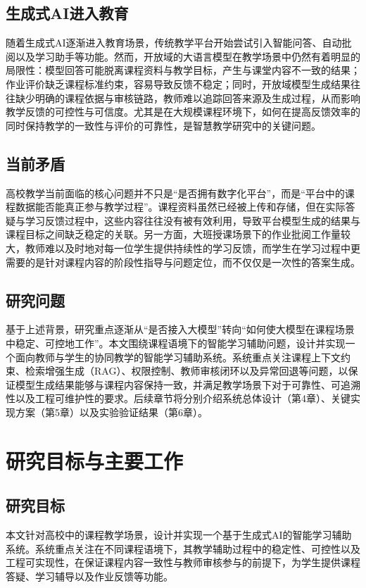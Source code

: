\documentclass[12pt,a4paper,oneside]{ctexbook}
\numberwithin{equation}{chapter}
\begin{document}
\subsection{生成式AI进入教育}
随着生成式AI逐渐进入教育场景，传统教学平台开始尝试引入智能问答、自动批阅以及学习助手等功能\cite{ref1,ref5}。然而，开放域的大语言模型在教学场景中仍然有着明显的局限性：模型回答可能脱离课程资料与教学目标，产生与课堂内容不一致的结果；作业评价缺乏课程标准约束，容易导致反馈不稳定；同时，开放域模型生成结果往往缺少明确的课程依据与审核链路，教师难以追踪回答来源及生成过程，从而影响教学反馈的可控性与可信度。尤其是在大规模课程环境下，如何在提高反馈效率的同时保持教学的一致性与评价的可靠性，是智慧教学研究中的关键问题。

\subsection{当前矛盾}
高校教学当前面临的核心问题并不只是“是否拥有数字化平台”，而是“平台中的课程数据能否能真正参与教学过程”。课程资料虽然已经被上传和存储，但在实际答疑与学习反馈过程中，这些内容往往没有被有效利用，导致平台模型生成的结果与课程目标之间缺乏稳定的关联。另一方面，大班授课场景下的作业批阅工作量较大，教师难以及时地对每一位学生提供持续性的学习反馈，而学生在学习过程中更需要的是针对课程内容的阶段性指导与问题定位，而不仅仅是一次性的答案生成。

\subsection{研究问题}
基于上述背景，研究重点逐渐从“是否接入大模型”转向“如何使大模型在课程场景中稳定、可控地工作”。本文围绕课程语境下的智能学习辅助问题，设计并实现一个面向教师与学生的协同教学的智能学习辅助系统。系统重点关注课程上下文约束、检索增强生成（RAG）、权限控制、教师审核闭环以及异常回退等问题，以保证模型生成结果能够与课程内容保持一致，并满足教学场景下对于可靠性、可追溯性以及工程可维护性的要求。后续章节将分别介绍系统总体设计（第4章）、关键实现方案（第5章）以及实验验证结果（第6章）。

\section{研究目标与主要工作}

\subsection{研究目标}
本文针对高校中的课程教学场景，设计并实现一个基于生成式AI的智能学习辅助系统。系统重点关注在不同课程语境下，其教学辅助过程中的稳定性、可控性以及工程可实现性，在保证课程内容一致性与教师审核参与的前提下，为学生提供课程答疑、学习辅导以及作业反馈等功能。
\end{document}
